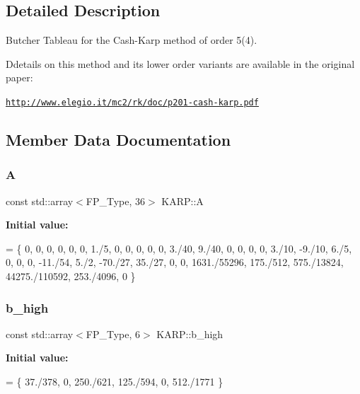 \subsection{Detailed Description}
Butcher Tableau for the Cash-\/\+Karp method of order 5(4). 

Ddetails on this method and its lower order variants are available in the original paper\+:

\href{http://www.elegio.it/mc2/rk/doc/p201-cash-karp.pdf}{\tt http\+://www.\+elegio.\+it/mc2/rk/doc/p201-\/cash-\/karp.\+pdf} 

\subsection{Member Data Documentation}
\mbox{\label{structKARP_a5e62cee865e772c7a7e7072f578c658d}} 
\subsubsection{\texorpdfstring{A}{A}}
{\footnotesize\ttfamily const std\+::array$<$F\+P\+\_\+\+Type, 36$>$ K\+A\+R\+P\+::A}

{\bfseries Initial value\+:}
\begin{DoxyCode}
= \{
    0,            0,         0,           0,              0,          0,
    1./5,         0,         0,           0,              0,          0,
    3./40,        9./40,     0,           0,              0,          0,
    3./10,        -9./10,    6./5,        0,              0,          0,
    -11./54,      5./2,      -70./27,     35./27,         0,          0,
    1631./55296,  175./512,  575./13824,  44275./110592,  253./4096,  0
  \}
\end{DoxyCode}
\mbox{\label{structKARP_af682eefba6a62bb8bf72efc293e2e361}} 
\subsubsection{\texorpdfstring{b\+\_\+high}{b\_high}}
{\footnotesize\ttfamily const std\+::array$<$F\+P\+\_\+\+Type, 6$>$ K\+A\+R\+P\+::b\+\_\+high}

{\bfseries Initial value\+:}
\begin{DoxyCode}
= \{
    37./378, 0, 250./621, 125./594, 0, 512./1771
  \}
\end{DoxyCode}
\mbox{\label{structKARP_a2833bea5896058e8ad8256a41e4e04d2}} 
